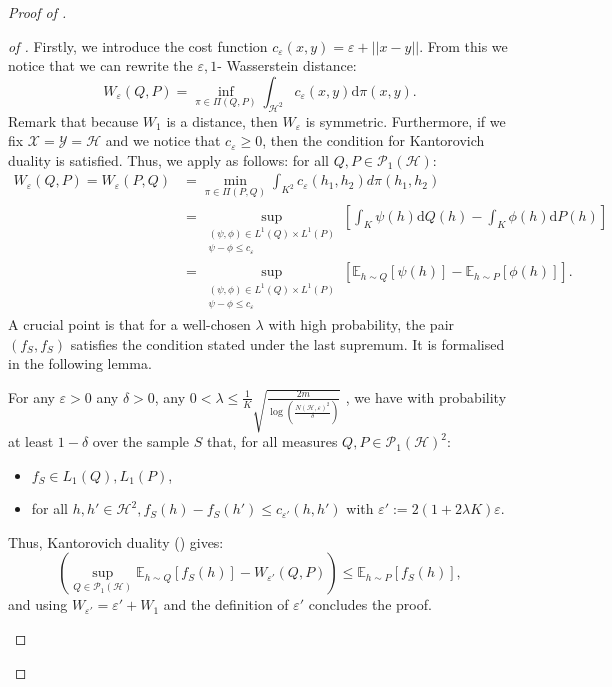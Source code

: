 \begin{proof}[Proof of ]
\begin{proof}[of ]
Firstly, we introduce the cost function $c_{\varepsilon}(x,y)= \varepsilon + ||x-y||$.
From this we notice that we can rewrite the $\varepsilon,1$- Wasserstein distance:
\[ W_{\varepsilon}(Q,P)= \inf_{\pi \in \Pi(Q,P)} \int_{\mathcal{H}^2} c_{\varepsilon}(x,y)\mathrm{d}\pi(x,y).  \]
Remark that because $W_1$ is a distance, then $W_\varepsilon$ is symmetric. Furthermore, if we fix $\mathcal{X}=\mathcal{Y}=\mathcal{H}$ and we notice that $c_{\varepsilon}\geq 0$, then the condition for Kantorovich duality is satisfied. Thus, we apply  as follows: for all $Q,P\in \mathcal{P}_1(\mathcal{H})$:
\begin{align*}
W_\varepsilon(Q,P)= W_\varepsilon(P,Q) & =  \min _{\pi \in \Pi(P, Q)}  \int_{K^2} c_{\varepsilon}(h_1, h_2) d \pi(h_1, h_2)  \\
&=\sup_{\substack{(\psi, \phi) \in L^1(Q) \times L^1(P)\\ \psi-\phi \leq c_{\varepsilon}}}\left[\int_{K} \psi(h) \mathrm{d}Q(h)- \int_{K} \phi(h) \mathrm{d}P(h)\right] \\
& = \sup_{\substack{(\psi, \phi) \in L^1(Q) \times L^1(P)\\ \psi-\phi \leq c_{\varepsilon}}}\left[\mathbb{E}_{h\sim Q}[ \psi(h)]- \mathbb{E}_{h\sim P}[ \phi(h)]\right].
\end{align*}
A crucial point is that for a well-chosen $\lambda$ with high probability, the pair $(f_S,f_S)$ satisfies the condition stated under the last supremum. It is formalised in the following lemma.
\begin{lemma}
\label{lem:kk}
For any $\varepsilon>0$ any $\delta>0$, any $0<\lambda\leq \frac{1}{K}\sqrt{\frac{2m}{\log\left(\frac{N(\mathcal{H},\varepsilon)^2}{\delta}\right)}}$ , we have with probability at least $1-\delta$ over the sample $S$ that, for all measures $Q,P\in\mathcal{P}_1(\mathcal{H})^2$:
\begin{itemize}
  \item $f_S\in L_1(Q),L_1(P)$,
  \item for all $h,h' \in \mathcal{H}^2, f_S(h)-f_S(h') \leq c_{\varepsilon'}(h,h')$ with $\varepsilon':= 2(1+2\lambda K) \varepsilon$.
\end{itemize}
Thus, Kantorovich duality () gives:
\[ \left(\sup_{Q\in \mathcal{P}_1(\mathcal{H})} \mathbb{E}_{h\sim Q}[ f_S(h)] -  W_{\varepsilon'}(Q,P) \right)\leq \mathbb{E}_{h\sim P}[ f_S(h)],    \]
and using $W_{\varepsilon'} = \varepsilon' + W_1$ and the definition of $\varepsilon'$ concludes the proof.

\end{lemma}
\end{proof}
\end{proof}
